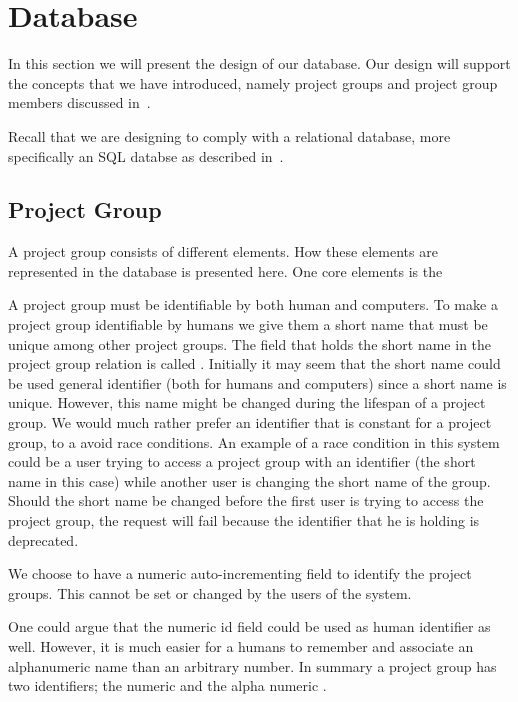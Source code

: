 \section{Database}
In this section we will present the design of our database.
Our design will support the concepts that we have introduced, namely project groups and project group members discussed in~.

Recall that we are designing to comply with a relational database, more specifically an SQL databse as described in~.

\subsection{Project Group}
A project group consists of different elements.
How these elements are represented in the database is presented here.
One core elements is the 

A project group must be identifiable by both human and computers.
To make a project group identifiable by humans we give them a short name that must be unique among other project groups.
The field that holds the short name in the project group relation is called .
Initially it may seem that the short name could be used general identifier (both for humans and computers) since a short name is unique.
However, this name might be changed during the lifespan of a project group.
We would much rather prefer an identifier that is constant for a project group, to a avoid race conditions.
An example of a race condition in this system could be a user trying to access a project group with an identifier (the short name in this case) while another user is changing the short name of the group.
Should the short name be changed before the first user is trying to access the project group, the request will fail because the identifier that he is holding is deprecated.

We choose to have a numeric auto-incrementing  field to identify the project groups.
This cannot be set or changed by the users of the system.

One could argue that the numeric id field could be used as human identifier as well.
However, it is much easier for a humans to remember and associate an alphanumeric name than an arbitrary number.
In summary a project group has two identifiers; the numeric  and the alpha numeric .

